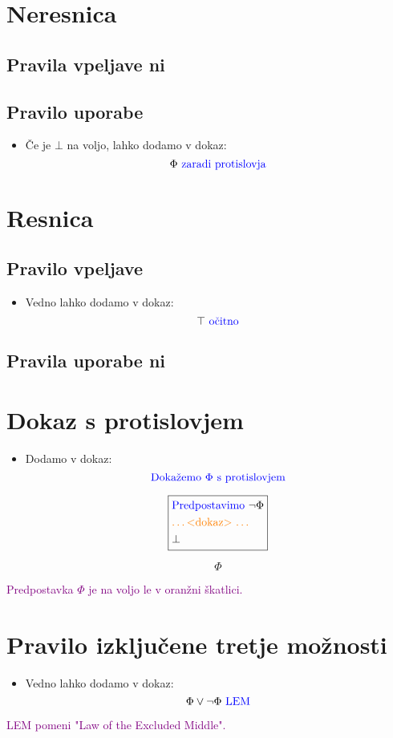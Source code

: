 \documentclass[12pt,a4paper]{article}
\newcommand{\blue}[1]{\textcolor{blue}{#1}}
\newcommand{\orange}[1]{\textcolor{orange}{#1}}
\newcommand{\purple}[1]{\textcolor{purple}{#1}}
\newcommand{\dokaz}{\orange{\text{\ldots <dokaz> \ldots}}}
\newcommand{\skatlica}[1]{
    \begin{equation*}
        \boxed{
        \begin{aligned}
            #1
        \end{aligned}
        }
    \end{equation*}
}
\begin{document}
\section{Neresnica}
    \subsection*{Pravila vpeljave ni}
    \subsection*{Pravilo uporabe}
    \begin{itemize}
        \item Če je $ \bot $ na voljo, lahko dodamo v dokaz:
        $$ \Phi \blue{\text{ zaradi protislovja}}  $$
    \end{itemize}

\section{Resnica}
    \subsection*{Pravilo vpeljave}
    \begin{itemize}
        \item Vedno lahko dodamo v dokaz:
        $$ \top \blue{\text{ očitno}}  $$
    \end{itemize}
    \subsection*{Pravila uporabe ni}

\section{Dokaz s protislovjem}
    \begin{itemize}
            \item Dodamo v dokaz:
            $$ \blue{\text{Dokažemo } \Phi \text{ s protislovjem}} $$
            \skatlica{
                &\blue{\text{Predpostavimo }} \neg \Phi \\ 
                &\dokaz \\ 
                &\bot 
            }
            $$ \Phi $$
    \end{itemize}
    \purple{Predpostavka $ \Phi $ je na voljo le v oranžni škatlici.}

\section{Pravilo izključene tretje možnosti}
    \begin{itemize}
        \item Vedno lahko dodamo v dokaz:
        $$ \Phi \vee \neg \Phi \blue{\text{ LEM}}  $$
    \end{itemize}
    \purple{LEM pomeni "Law of the Excluded Middle".}
\end{document}
